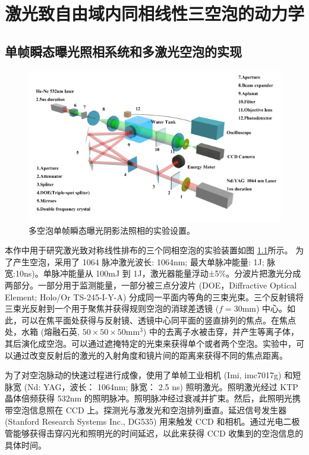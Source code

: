 \chapter{激光致自由域内同相线性三空泡的动力学}

\section{单帧瞬态曝光照相系统和多激光空泡的实现}
\begin{figure}[H]
    \centering
    \includegraphics[width=\linewidth]{img/fig4.1.png}
    \caption{多空泡单帧瞬态曝光阴影法照相的实验设置。}
    \label{fig4.1}
\end{figure}




本作中用于研究激光致对称线性排布的三个同相空泡的实验装置如图 \ref{fig4.1}所示。
为了产生空泡，采用了 1064 脉冲激光波长: 1064nm; 最大单脉冲能量: 1J;
脉宽:10ns)。单脉冲能量从 100mJ 到
1J，激光器能量浮动±5\%。分波片把激光分成两部分。一部分用于监测能量，一部分被三点分波片
(DOE，Diffractive Optical Element; Holo/Or TS-245-I-Y-A)
分成同一平面内等角的三束光束。三个反射镜将三束光反射到一个用于聚焦并获得规则空泡的消球差透镜
($f=30\mathrm {mm}$)
中心。如此，可以在焦平面处获得与反射镜、透镜中心同平面的竖直排列的焦点。在焦点处，水箱
(熔融石英, $50\times 50 \times 50 \mathrm{mm^3}$)
中的去离子水被击穿，并产生等离子体，其后演化成空泡。可以通过遮掩特定的光束来获得单个或者两个空泡。实验中，可以通过改变反射后的激光的入射角度和镜片间的距离来获得不同的焦点距离。

为了对空泡脉动的快速过程进行成像，使用了单帧工业相机 (Imi, imc7017g)
和短脉宽 (Nd: YAG，波长： 1064nm; 脉宽： 2.5 ns) 照明激光。照明激光经过
KTP 晶体倍频获得 532nm
的照明脉冲。照明脉冲经过衰减并扩束。然后，此照明光携带空泡信息照在 CCD
上。探测光与激发光和空泡排列垂直。延迟信号发生器 (Stanford Research
Systems Inc., DG535) 用来触发 CCD
和相机。通过光电二极管能够获得击穿闪光和照明光的时间延迟，以此来获得 CCD
收集到的空泡信息的具体时间。

